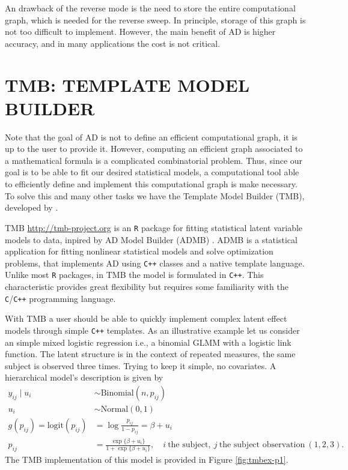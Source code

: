 An drawback of the reverse mode is the need to store the entire
computational graph, which is needed for the reverse sweep. In
principle, storage of this graph is not too difficult to implement.
However, the main benefit of AD is higher accuracy, and in many
applications the cost is not critical.

\section{TMB: TEMPLATE MODEL BUILDER}
\label{cap:tmb}

Note that the goal of AD is not to define an efficient computational
graph, it is up to the user to provide it. However, computing an
efficient graph associated to a mathematical formula is a complicated
combinatorial problem. Thus, since our goal is to be able to fit our
desired statistical models, a computational tool able to efficiently
define and implement this computational graph is make necessary. To
solve this and many other tasks we have the Template Model Builder
(TMB), developed by .

TMB \url{ http://tmb-project.org} is an \texttt{R} \cite{R21} package
for fitting statistical latent variable models to data, inpired by AD
Model Builder (ADMB) \cite{ADMB}. ADMB is a statistical application for
fitting nonlinear statistical models and solve optimization problems,
that implements AD using \texttt{C++} classes and a native template
language. Unlike most \texttt{R} packages, in TMB the model is
formulated in \texttt{C++}. This characteristic provides great
flexibility but requires some familiarity with the
\texttt{C}/\texttt{C++} programming language.

With TMB a user should be able to quickly implement complex latent
effect models through simple \texttt{C++} templates. As an illustrative
example let us consider an simple mixed logistic regression i.e., a
binomial GLMM with a logistic link function. The latent structure is in
the context of repeated measures, the same subject is observed three
times. Trying to keep it simple, no covariates. A hierarchical model's
description is given by
\begin{align*}
 y_{ij} \mid u_{i} &\sim \text{Binomial}(n, p_{ij})\\
            u_{i} &\sim \text{Normal}(0, 1)\\
 g(p_{ij}) = \text{logit}(p_{ij}) &=
 \log\frac{p_{ij}}{1 - p_{ij}} = \beta + u_{i}\\
 p_{ij} &= \frac{\exp\{\beta + u_{i}\}}{1 + \exp\{\beta + u_{i}\}},\quad
 i~\text{the subject},~j~\text{the subject observation}~(1,2,3).
\end{align*}
The TMB implementation of this model is provided in Figure
\autoref{fig:tmbex-p1}.

